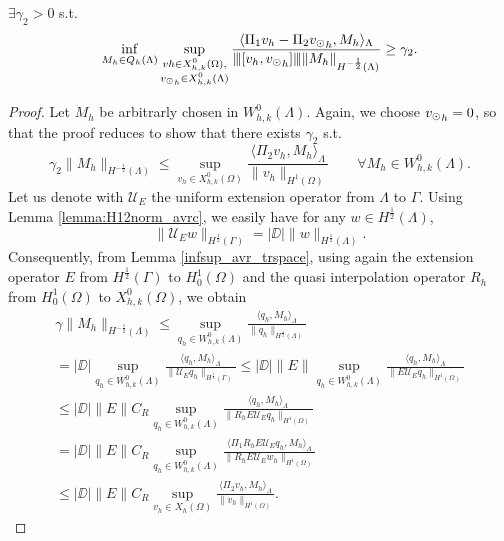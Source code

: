 \begin{theorem}
$\exists \gamma _2 >0$ s.t.
\begin{equation}
\inf_{M_h \in Q_h(\Lambda)} 
\sup_{\substack{vh \in X^0_{h,k}(\Omega),\\ {v_{\odot}}_h \in X^0_{h,k}(\Lambda)} }\frac{\langle \Pi_1 v_h - \Pi_2 {v_{\odot}}_h, M_h \rangle _{\Lambda} } {{\left\vert\kern-0.25ex\left\vert\kern-0.25ex\left\vert [v_h, {v_{\odot}}_h] \right\vert\kern-0.25ex\right\vert\kern-0.25ex\right\vert} \|M_h\|_{H^{-\frac 12 }(\Lambda)} } 
\geq \gamma _2. 
\end{equation}
\end{theorem}
\begin{proof}
Let $M_h$ be arbitrarly chosen in $W_{h,k}^0(\Lambda)$. Again, we choose ${v_{\odot}}_h =0$, so that the proof reduces to show that there exists $\gamma_2$ s.t.
\begin{equation*}
\gamma _2 \|M_h\|_{H^{-\frac 12}(\Lambda)}
\leq 
\sup_{v_h \in X_{h,k}^0(\Omega)} \frac{ \langle \Pi_2 v_h , M_h \rangle _{\Lambda} } {\|v_h\|_{H^1(\Omega)} } \qquad \forall M_h \in W_{h,k}^0(\Lambda).
\end{equation*}
Let us denote with $\mathcal{U}_E$ the uniform extension operator from $\Lambda$ to $\Gamma$. Using Lemma \ref{lemma:H12norm_avrc}, we easily have for any $w \in H^{\frac 12}(\Lambda)$,
\begin{equation*}
\|\mathcal{U}_E w\|_{H^{\frac 12}(\Gamma)}=|\DD| \|w\|_{H^{\frac 12}(\Lambda)}.
\end{equation*}
Consequently, from Lemma \ref{infsup_avr_trspace}, using again the extension operator $E$ from $H^{\frac 12}(\Gamma)$ to $H^1_0(\Omega)$ and the quasi interpolation operator $R_h$ from $H^1_0(\Omega)$ to $X^0_{h,k}(\Omega)$, we obtain
\begin{multline}
\gamma \|M_h\|_{H^{-\frac 12}(\Lambda)} \leq 
\sup_{q_h \in W_{h,k}^0(\Lambda)} \frac{ \langle q_h, M_h \rangle_{\Lambda} } {\|q_h\|_{H^{\frac 12}(\Lambda)}} 
\\
= |\DD| \sup_{q_h \in W_{h,k}^0(\Lambda)} \frac{ \langle q_h, M_h \rangle _{\Lambda}} {\|\mathcal{U}_E q_h\|_{H^{\frac 12}(\Gamma)}} 
\leq |\DD|\|E\| \sup_{q_h \in W_{h,k}^0(\Lambda)} \frac{ \langle q_h, M_h \rangle _{\Lambda} } {\|E \mathcal{U}_E q_h\|_{H^1(\Omega)}} 
\\
\leq |\DD|\|E\| C_R \sup_{q_h \in W_{h,k}^0(\Lambda)} \frac{ \langle q_h, M_h \rangle _{\Lambda} } {\|R_h E \mathcal{U}_E q_h\|_{H^1(\Omega)}}
\\ 
=  |\DD|\|E\| C_R \sup_{q_h \in W_{h,k}^0(\Lambda)} \frac{ \langle \Pi _1  R_h E \mathcal{U}_E q_h, M_h \rangle _{\Lambda}} {\|R_h E \mathcal{U}_E w_h\|_{H^1(\Omega)}}
\\
\leq |\DD|\|E\| C_R \sup_{v_h \in X_h(\Omega)} \frac{ \langle \Pi _2  v_h, M_h \rangle _{\Lambda}} {\|v_h\|_{H^1(\Omega)}}. 
\end{multline}
\end{proof}